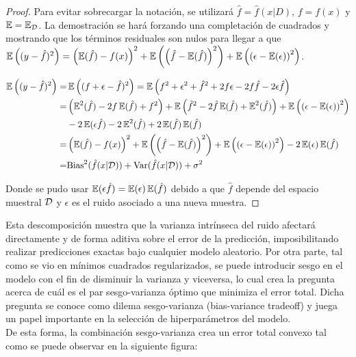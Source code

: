 \begin{proof}

Para evitar sobrecargar la notación, se utilizará $\hat{f}=\hat{f}(x|D)$, $f=f(x)$ y $\operatorname{\mathbb{E}}=\operatorname{\mathbb{E}}_{\mathcal D}$. La demostración se hará forzando una completación de cuadrados y mostrando que los términos residuales son nulos para llegar a que $\operatorname{\mathbb{E}}\left((y-\hat{f})^2\right) = \left(\operatorname{\mathbb{E}}(\hat{f}) - f(x)\right)^2 + \operatorname{\mathbb{E}}\left(\left(\hat{f}-\operatorname{\mathbb{E}}(\hat{f})\right)^2\right) + \operatorname{\mathbb{E}}\left(\left(\epsilon-\operatorname{\mathbb{E}}(\epsilon)\right)^2\right)$.

\begin{align*}
	\operatorname{\mathbb{E}}\left((y-\hat{f})^2\right) =& \operatorname{\mathbb{E}}\left((f+\epsilon-\hat{f})^2\right) = \operatorname{\mathbb{E}}\left(f^2+\epsilon^2+\hat{f}^2 +2f\epsilon - 2f\hat{f} - 2\epsilon \hat{f}\right)\\
	=&\left(\operatorname{\mathbb{E}}^2(\hat{f})-2f\operatorname{\mathbb{E}}(\hat{f}) + f^2\right) + \operatorname{\mathbb{E}}\left(\hat{f}^2-2\hat{f}\operatorname{\mathbb{E}}(\hat{f})+\operatorname{\mathbb{E}}^2(\hat{f})\right) + \operatorname{\mathbb{E}}\left(\left(\epsilon-\operatorname{\mathbb{E}}(\epsilon)\right)^2\right)\\
	& - 2\operatorname{\mathbb{E}}(\epsilon\hat{f})-2\operatorname{\mathbb{E}}^2(\hat{f})+2\operatorname{\mathbb{E}}(\hat{f})\operatorname{\mathbb{E}}(\hat{f})\\
	=& \left(\operatorname{\mathbb{E}}(\hat{f}) - f(x)\right)^2 + \operatorname{\mathbb{E}}\left(\left(\hat{f}-\operatorname{\mathbb{E}}(\hat{f})\right)^2\right) + \operatorname{\mathbb{E}}\left(\left(\epsilon-\operatorname{\mathbb{E}}(\epsilon)\right)^2\right) - 2\operatorname{\mathbb{E}}(\epsilon)\operatorname{\mathbb{E}}(\hat{f})\\
	= & \text{Bias}^2(\hat{f}(x|{\mathcal D})) + \text{Var}(\hat{f}(x|{\mathcal D})) + \sigma^2
\end{align*}

Donde se pudo usar $\operatorname{\mathbb{E}}(\epsilon\hat{f})=\operatorname{\mathbb{E}}(\epsilon)\operatorname{\mathbb{E}}(\hat{f})$ debido a que $\hat{f}$ depende del espacio muestral ${\mathcal D}$ y $\epsilon$ es el ruido asociado a una nueva muestra.

\end{proof} 

Esta descomposición muestra que la varianza intrínseca del ruido afectará directamente y de forma aditiva sobre el error de la predicción, imposibilitando realizar predicciones exactas bajo cualquier modelo aleatorio. Por otra parte, tal como se vio en mínimos cuadrados regularizados, se puede introducir sesgo en el modelo con el fin de disminuir la varianza y viceversa, lo cual crea la pregunta acerca de cuál es el par sesgo-varianza óptimo que minimiza el error total. Dicha pregunta se conoce como dilema sesgo-varianza (bias-variance tradeoff) y juega un papel importante en la selección de hiperparámetros del modelo.\\

De esta forma, la combinación sesgo-varianza crea un error total convexo tal como se puede observar en la siguiente figura:


